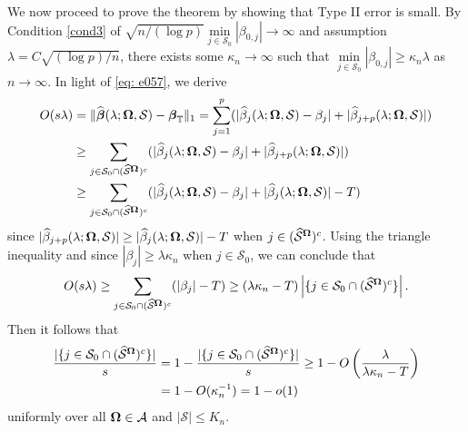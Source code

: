 \documentclass[11pt]{article}
\newcommand{\bbeta}{\mbox{\boldmath $\beta$}}
\newcommand{\bOmg}{\mbox{\boldmath $\Omega$}}
\newcommand{\calA}{{\cal A}}
\newcommand{\sbOmg}{\mbox{\scriptsize\boldmath $\Omega$}}
\begin{document}
We now proceed to prove the theorem by showing that Type II error is small.
By Condition \ref{cond3} of $\sqrt{n/(\log p)}\min\limits_{j\in \mathcal{S}_0}|\beta_{0,j}|\rightarrow \infty$ and assumption $\lambda= C\sqrt{(\log p)/n}$,  there exists some $\kappa_n \rightarrow \infty$ such that $\min\limits_{j\in \mathcal{S}_0}|\beta_{0,j}|\geq \kappa_n\lambda$ as $n\rightarrow \infty$.
In light of \eqref{eq: e057}, we derive
\begin{align*}
O(s\lambda)
& = \|\widehat{\bbeta}(\lambda; \bOmg, \mathcal S)-\bbeta_{\mathbb{T}}\|_1
= \sum_{j=1}^{p} (| \widehat{\beta}_{j}(\lambda; \bOmg, \mathcal S) - \beta_{j} |+ | \widehat{\beta}_{j+p}(\lambda; \bOmg, \mathcal S) | )\\
& \geq \sum_{j \in \mathcal{S}_0 \cap (\widehat{\mathcal S}^{\sbOmg})^{c} } (| \widehat{\beta}_{j}(\lambda; \bOmg, \mathcal S) - \beta_{j} | + | \widehat{\beta}_{j+p}(\lambda; \bOmg, \mathcal S) | )\\
& \geq \sum_{j \in \mathcal{S}_0 \cap (\widehat{\mathcal S}^{\sbOmg})^{c} } (| \widehat{\beta}_{j}(\lambda; \bOmg, \mathcal S) - \beta_{j} | + | \widehat{\beta}_{j}(\lambda; \bOmg, \mathcal S) |  - T)
\end{align*}
since $| \widehat{\beta}_{j+p}(\lambda; \bOmg, \mathcal S)| \geq | \widehat{\beta}_{j}(\lambda; \bOmg, \mathcal S) | - T $ when $j \in (\widehat{\mathcal S}^{\sbOmg}) ^{c}$.
Using the triangle inequality and since $ |\beta_{j}| \geq \lambda\kappa_{n} $ when $j \in \mathcal{S}_0 $, we can conclude that
$$ O(s\lambda)
\geq \sum_{j \in \mathcal{S}_0 \cap (\widehat{\mathcal S}^{\sbOmg})^{c} } (| \beta_{j} | - T)
\geq (\lambda\kappa_{n} - T) \left|\{j\in \mathcal{S}_0\cap (\widehat{\mathcal S}^{\sbOmg})^{c}\}\right|. $$
Then it follows that
\begin{align*}
 \dfrac{ |\{j\in \mathcal{S}_0\cap (\widehat{\mathcal S}^{\sbOmg})^c\}|}{s}
& = 1 - \dfrac{ |\{j\in \mathcal{S}_0\cap (\widehat{\mathcal S}^{\sbOmg})^{c}\}| }{s}
\geq 1 - O \left( \dfrac{\lambda}{\lambda\kappa_{n} - T} \right) \\
& = 1 - O(\kappa_{n} ^{-1}) = 1-o(1)
\end{align*}
uniformly over all $\bOmg \in \calA$ and $|\mathcal S| \leq K_n$.
\end{document}
